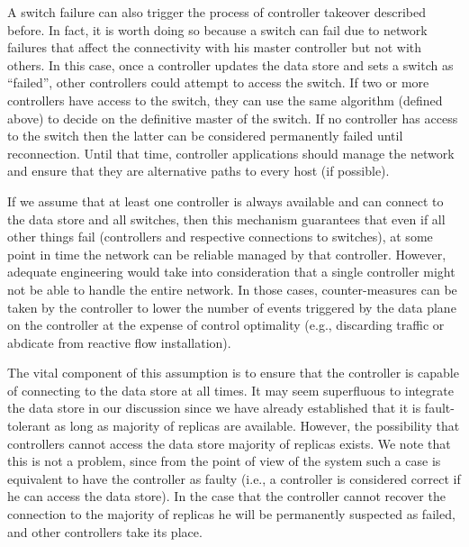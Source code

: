 A switch failure can also trigger the process of controller takeover described before. 
In fact, it is worth doing so because a switch can fail due to network failures that affect the connectivity with his master controller but not with others.  
In this case, once  a controller updates the data store and sets a switch as ``failed'', other controllers could attempt to access the switch.
If two or more controllers have access to the switch, they can use the same algorithm (defined above) to decide on the definitive master of the switch. 
If no controller has access to the switch then the latter can be considered permanently failed until reconnection.
Until that time, controller applications should manage the network and ensure that they are alternative paths to every host (if possible). 

If we assume that at least one controller is always available and can connect to the data store and all switches, then this mechanism guarantees that even if all other things fail (controllers and respective connections to switches), at some point in time the network can be reliable managed by that controller. 
However, adequate engineering would  take into consideration that a single controller might not be able to handle the entire network. In those cases, counter-measures can be taken by the controller to lower the number of events triggered by the data plane on the controller at the expense of control optimality (e.g., discarding traffic or abdicate from reactive flow installation). 

The vital component of this assumption is to ensure that the controller is capable of connecting to the data store at all times. 
It may seem superfluous to integrate the data store in our discussion since we have already established that it is fault-tolerant as long as majority of replicas are available. 
However, the possibility that controllers cannot access the data store majority of replicas exists. 
We note that this is not a problem, since from the point of view of the system such a case is equivalent to have the controller as faulty (i.e., a controller is considered correct if he can access the data store). 
In the case that the controller cannot recover the  connection to the majority of replicas he will be permanently suspected as failed, and other controllers take its place. 

